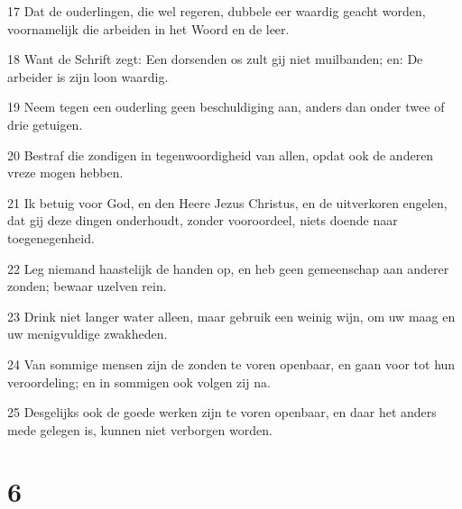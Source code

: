 \par 17 Dat de ouderlingen, die wel regeren, dubbele eer waardig geacht worden, voornamelijk die arbeiden in het Woord en de leer.
\par 18 Want de Schrift zegt: Een dorsenden os zult gij niet muilbanden; en: De arbeider is zijn loon waardig.
\par 19 Neem tegen een ouderling geen beschuldiging aan, anders dan onder twee of drie getuigen.
\par 20 Bestraf die zondigen in tegenwoordigheid van allen, opdat ook de anderen vreze mogen hebben.
\par 21 Ik betuig voor God, en den Heere Jezus Christus, en de uitverkoren engelen, dat gij deze dingen onderhoudt, zonder vooroordeel, niets doende naar toegenegenheid.
\par 22 Leg niemand haastelijk de handen op, en heb geen gemeenschap aan anderer zonden; bewaar uzelven rein.
\par 23 Drink niet langer water alleen, maar gebruik een weinig wijn, om uw maag en uw menigvuldige zwakheden.
\par 24 Van sommige mensen zijn de zonden te voren openbaar, en gaan voor tot hun veroordeling; en in sommigen ook volgen zij na.
\par 25 Desgelijks ook de goede werken zijn te voren openbaar, en daar het anders mede gelegen is, kunnen niet verborgen worden.

\chapter{6}

